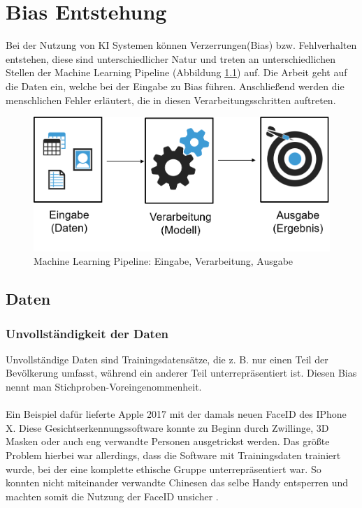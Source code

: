\documentclass[12pt,oneside,a4paper,parskip]{scrbook}
\begin{document}
\chapter{Bias Entstehung}
\label{chapter:BiasEntstehung}
Bei der Nutzung von KI Systemen können Verzerrungen(Bias) bzw. Fehlverhalten entstehen, diese sind unterschiedlicher Natur und treten an unterschiedlichen Stellen der Machine Learning Pipeline (Abbildung \ref{fig:dataBias}) auf. Die Arbeit geht auf die Daten ein, welche bei der Eingabe zu Bias führen. Anschließend werden die menschlichen Fehler erläutert, die in diesen Verarbeitungsschritten auftreten.

\begin{figure}[h]
	\begin{center}
		\includegraphics[width=12cm]{Bilder/data_bias.png}
		\caption{Machine Learning Pipeline: Eingabe, Verarbeitung, Ausgabe\cite{biasEffekt}}
		\label{fig:dataBias}
	\end{center}
\end{figure}

\section{Daten}
\label{section:data}
\subsection{Unvollständigkeit der Daten}
\label{section:uncompleteData}
Unvollständige Daten sind Trainingsdatensätze, die z. B. nur einen Teil der Bevölkerung umfasst, während ein anderer Teil unterrepräsentiert ist. Diesen Bias nennt man Stichproben-Voreingenommenheit.
\\\\
Ein Beispiel dafür lieferte Apple 2017 mit der damals neuen FaceID des IPhone X.
Diese Gesichtserkennungssoftware konnte zu Beginn durch Zwillinge, 3D Masken oder auch eng verwandte Personen ausgetrickst werden. Das größte Problem hierbei war allerdings, dass die Software mit Trainingsdaten trainiert wurde, bei der eine komplette ethische Gruppe unterrepräsentiert war. So konnten nicht miteinander verwandte Chinesen das selbe Handy entsperren und machten somit die Nutzung der FaceID unsicher \cite{iphone}.
\end{document}
